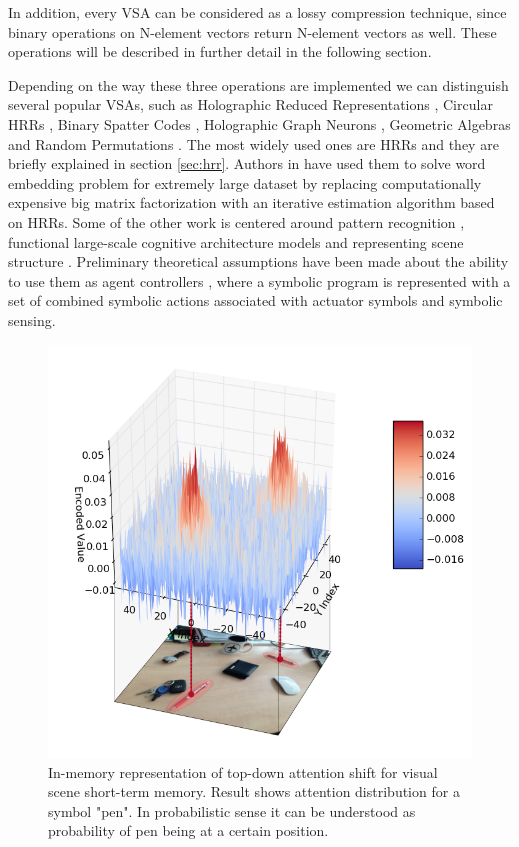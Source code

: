 \documentclass[conference]{IEEEtran}
\begin{document}
	In addition, every VSA can be considered as a lossy compression technique, since binary operations on N-element vectors return N-element vectors as well. These operations will be described in further detail in the following section. 
	
	Depending on the way these three operations are implemented we can distinguish several popular VSAs, such as Holographic Reduced Representations \cite{Plate:1995:HolographicReducedRepresentations}, Circular HRRs \cite{DeVine:2010:Semanticoscillations}, Binary Spatter Codes \cite{Kanerva:1994:SpatterCodeEncoding}, Holographic Graph Neurons \cite{Kleyko:2016:HolographicGraphNeuron}, Geometric Algebras \cite{Patyk-Lonska:2011:DistributedRepresentationsBased} and Random Permutations \cite{Recchia:2015:EncodingSequentialInformation}.
The most widely used ones are HRRs and they are briefly explained in section \ref{sec:hrr}.
Authors in \cite{Golosio:2015:CognitiveNeuralArchitecture} have used them to solve word embedding problem for extremely large dataset by replacing computationally expensive big matrix factorization with an iterative estimation algorithm based on HRRs.
Some of the other work is centered around pattern recognition \cite{Kleyko:2016:PatternRecognitionVector}, functional large-scale cognitive architecture models \cite{Eliasmith:2012:LargeScaleModel} and representing scene structure \cite{scene-structure}.
Preliminary theoretical assumptions have been made about the ability to use them as agent controllers \cite{Levy:2013:LearningBehaviorHierarchies}, where a symbolic program is represented with a set of combined symbolic actions associated with actuator symbols and symbolic sensing.
	
	
	\begin{figure}
		\center
		\includegraphics[width=0.9\columnwidth]{img/probe_for_pen_w_img.png}
		\caption{In-memory representation of top-down attention shift for visual scene short-term memory. Result shows attention distribution for a symbol "pen". In probabilistic sense it can be understood as probability of pen being at a certain position.}
	\end{figure}
	
\end{document}

